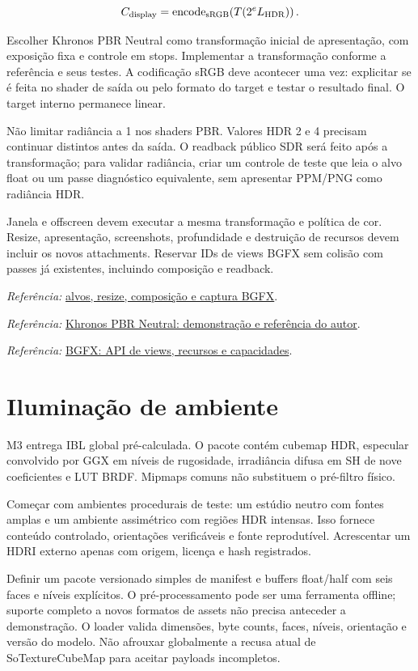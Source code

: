\documentclass[11pt,a4paper]{article}
\newcommand{\src}[2]{\par{\small\textit{Referência:} \href{#1}{#2}.}\par}
\begin{document}
\begin{equation}
C_{\rm display}=\operatorname{encode}_{\rm sRGB}\!\left(T(2^e L_{\rm HDR})\right).
\end{equation}

Escolher Khronos PBR Neutral como transformação inicial de apresentação, com exposição fixa e controle em stops. Implementar a transformação conforme a referência e seus testes. A codificação sRGB deve acontecer uma vez: explicitar se é feita no shader de saída ou pelo formato do target e testar o resultado final. O target interno permanece linear.

Não limitar radiância a 1 nos shaders PBR. Valores HDR 2 e 4 precisam continuar distintos antes da saída. O readback público SDR será feito após a transformação; para validar radiância, criar um controle de teste que leia o alvo float ou um passe diagnóstico equivalente, sem apresentar PPM/PNG como radiância HDR.

Janela e offscreen devem executar a mesma transformação e política de cor. Resize, apresentação, screenshots, profundidade e destruição de recursos devem incluir os novos attachments. Reservar IDs de views BGFX sem colisão com passes já existentes, incluindo composição e readback.
\src{/mnt/Laranja/Git/externos/coin-render/src/rendering/coinbgfx/CoinBgfxBackend.cpp}{alvos, resize, composição e captura BGFX}
\src{https://modelviewer.dev/examples/tone-mapping}{Khronos PBR Neutral: demonstração e referência do autor}
\src{https://bkaradzic.github.io/bgfx/bgfx.html}{BGFX: API de views, recursos e capacidades}

\section{Iluminação de ambiente}

M3 entrega IBL global pré-calculada. O pacote contém cubemap HDR, especular convolvido por GGX em níveis de rugosidade, irradiância difusa em SH de nove coeficientes e LUT BRDF. Mipmaps comuns não substituem o pré-filtro físico.

Começar com ambientes procedurais de teste: um estúdio neutro com fontes amplas e um ambiente assimétrico com regiões HDR intensas. Isso fornece conteúdo controlado, orientações verificáveis e fonte reprodutível. Acrescentar um HDRI externo apenas com origem, licença e hash registrados.

Definir um pacote versionado simples de manifest e buffers float/half com seis faces e níveis explícitos. O pré-processamento pode ser uma ferramenta offline; suporte completo a novos formatos de assets não precisa anteceder a demonstração. O loader valida dimensões, byte counts, faces, níveis, orientação e versão do modelo. Não afrouxar globalmente a recusa atual de SoTextureCubeMap para aceitar payloads incompletos.
\end{document}
